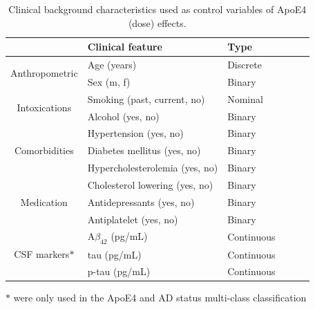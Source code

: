 \documentclass{amsart}
\begin{document}
\begin{table}[htb]
\caption{Clinical background characteristics used as control variables of ApoE4 (dose) effects.}
\label{tab:clin}
\begin{threeparttable}
\begin{tabular}{clllll} \toprule
                                & \textbf{Clinical feature}   & \textbf{Type}  \\ \midrule
\multirow{2}{*}{Anthropometric} & Age (years)                         & Discrete       \\
                                & Sex (m, f)                  & Binary         \\
\multirow{2}{*}{Intoxications}  & Smoking (past, current, no) & Nominal        \\
                                & Alcohol (yes, no)           & Binary         \\
\multirow{3}{*}{Comorbidities}  & Hypertension (yes, no)      & Binary         \\
                                & Diabetes mellitus (yes, no) & Binary         \\
                                & Hypercholesterolemia (yes, no) & Binary      \\
\multirow{3}{*}{Medication}     & Cholesterol lowering (yes, no) & Binary      \\
                                & Antidepressants (yes, no)   & Binary         \\
                                & Antiplatelet (yes, no)      & Binary         \\ 
\multirow{3}{*}{CSF markers$\ast$}    & A$\beta_{42}$ (pg/mL) & Continuous     \\
                                & tau (pg/mL)                 & Continuous     \\
                                & p-tau  (pg/mL)              & Continuous     \\\bottomrule
\end{tabular}
\begin{tablenotes}
  \item[$\ast$] were only used in the ApoE4 and AD status multi-class classification
\end{tablenotes}
\end{threeparttable}
\end{table}
\end{document}
